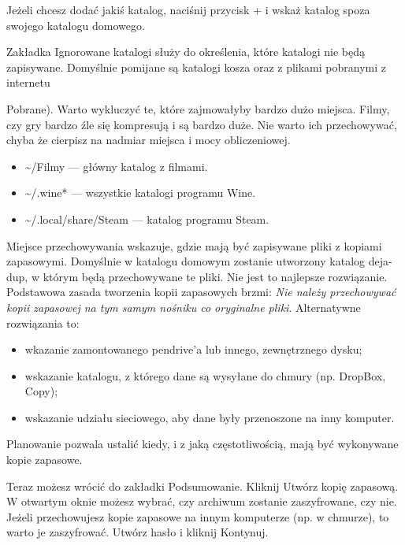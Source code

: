 Jeżeli chcesz dodać jakiś katalog, naciśnij przycisk \textcolor{ubuntu_orange}{+} i wskaż katalog spoza swojego katalogu domowego.

Zakładka \textcolor{ubuntu_orange}{Ignorowane katalogi} służy do określenia, które katalogi nie będą zapisywane. Domyślnie pomijane są katalogi kosza oraz z plikami pobranymi z internetu {Pobrane). Warto wykluczyć te, które zajmowałyby bardzo dużo miejsca. Filmy, czy gry bardzo źle się kompresują i są bardzo duże. Nie warto ich przechowywać, chyba że cierpisz na nadmiar miejsca i mocy obliczeniowej.
\begin{itemize}
\item \textcolor{ubuntu_orange}{\textasciitilde /Filmy} --- główny katalog z filmami.
\item \textcolor{ubuntu_orange}{\textasciitilde /.wine*} --- wszystkie katalogi programu Wine.
\item \textcolor{ubuntu_orange}{\textasciitilde /.local/share/Steam} --- katalog programu Steam.
\end{itemize}

\textcolor{ubuntu_orange}{Miejsce przechowywania} wskazuje, gdzie mają być zapisywane pliki z kopiami zapasowymi.  Domyślnie w katalogu domowym zostanie utworzony katalog \textcolor{ubuntu_orange}{deja-dup}, w którym będą przechowywane te pliki. Nie jest to najlepsze rozwiązanie. Podstawowa zasada tworzenia kopii zapasowych brzmi: \emph{Nie należy przechowywać kopii zapasowej na tym samym nośniku co oryginalne pliki}. Alternatywne rozwiązania to:
\begin{itemize}
\item wkazanie zamontowanego pendrive'a lub innego, zewnętrznego dysku;
\item wskazanie katalogu, z którego dane są wysyłane do chmury (np. DropBox, Copy);
\item wskazanie udziału sieciowego, aby dane były przenoszone na inny komputer.
\end{itemize}

\textcolor{ubuntu_orange}{Planowanie} pozwala ustalić kiedy, i z jaką częstotliwością, mają być wykonywane kopie zapasowe.

Teraz możesz wrócić do zakładki \textcolor{ubuntu_orange}{Podsumowanie}. Kliknij \textcolor{ubuntu_orange}{Utwórz kopię zapasową}. W otwartym oknie możesz wybrać, czy archiwum zostanie zaszyfrowane, czy nie. Jeżeli przechowujesz kopie zapasowe na innym komputerze (np. w chmurze), to warto je zaszyfrować. Utwórz hasło i kliknij \textcolor{ubuntu_orange}{Kontynuj}.

}
